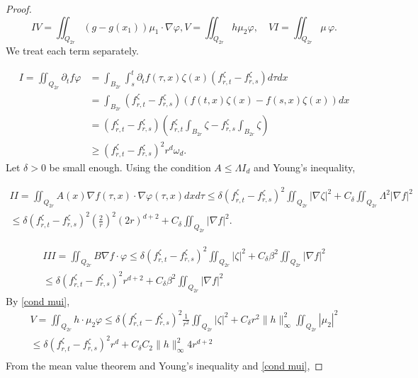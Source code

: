 \documentclass[reqno,12pt,twoside]{amsart}
\numberwithin{equation}{section} \numberwithin{theorem}{section}
\numberwithin{proposition}{section} \numberwithin{lemma}{section}
\numberwithin{corollary}{section}
\numberwithin{definition}{section} \numberwithin{remark}{section}
\begin{document}
\begin{proof}
\[IV = \iint_{Q_{2r}} (g-g(x_1)) \mu_1 \cdot \nabla \varphi , V = \iint_{Q_{2r}} h \mu_2 \varphi, \quad VI = \iint_{Q_{2r}}\mu \,\varphi.\] 
We treat each term separately.

\begin{align}\label{Poinc 1}
I= \iint_{Q_{2r}} \partial_t f\varphi  &=  \int_{B_{2r}}\int_s^t \partial_t f(\tau,x) \zeta(x) (f_{r,t}^\zeta - f_{r,s}^\zeta) d\tau dx \nonumber\\
&= \int_{B_{2r}} (f_{r,t}^\zeta - f_{r,s}^\zeta) (f(t,x)\zeta (x) - f(s,x) \zeta (x))dx \nonumber\\
&= (f_{r,t}^\zeta - f_{r,s}^\zeta) \left(f_{r,t}^\zeta \int_{B_{2r}}\zeta - f_{r,s}^\zeta \int_{B_{2r}}\zeta\right) \nonumber\\
&\geqslant (f_{r,t}^\zeta - f_{r,s}^\zeta)^2 r^d \omega_d. 
\end{align} 
%
Let $\delta >0$ be small enough. Using the condition $A\leqslant \Lambda I_d$ and Young's inequality,

\begin{multline}\label{Poinc 2}
II =\iint_{Q_{2r}} A(x)\nabla f(\tau,x) \cdot \nabla \varphi(\tau,x) dxd\tau \leqslant \delta (f_{r,t}^\zeta - f_{r,s}^\zeta)^2\iint_{Q_{2r}}|\nabla \zeta|^2 + C_\delta \iint_{Q_{2r}} \Lambda^2 |\nabla f|^2\\
\leqslant \delta (f_{r,t}^\zeta - f_{r,s}^\zeta)^2 \left(\frac{2}{r}\right)^2 (2r)^{d+2} + C_\delta \iint_{Q_{2r}}|\nabla f|^2.
\end{multline}

\begin{multline}\label{Poinc 3}
III =\iint_{Q_{2r}} B\nabla f \cdot \varphi \leqslant \delta (f_{r,t}^\zeta - f_{r,s}^\zeta)^2\iint_{Q_{2r}}|\zeta|^2 +C_\delta \beta^2 \iint_{Q_{2r}} |\nabla f|^2\\
\leqslant  \delta (f_{r,t}^\zeta - f_{r,s}^\zeta)^2 r^{d+2}  + C_\delta \beta^2 \iint_{Q_{2r}}|\nabla f|^2
\end{multline}
By \eqref{cond mui},
\begin{multline}\label{Poinc 5}
V = \iint_{Q_{2r}} h\cdot \mu_2 \varphi \leqslant \delta (f_{r,t}^\zeta - f_{r,s}^\zeta)^2\frac{1}{r^2}\iint_{Q_{2r}}|\zeta|^2 + C_\delta r^2  \|h\|_\infty^2\iint_{Q_{2r}}  |\mu_2|^2 \\
\leqslant \delta (f_{r,t}^\zeta - f_{r,s}^\zeta)^2 r^d + C_\delta C_2 \|h\|_\infty^2 4r^{d+2} \\  
\end{multline}
From the mean value theorem and Young's inequality and \eqref{cond mui},


\end{proof}
\end{document}

